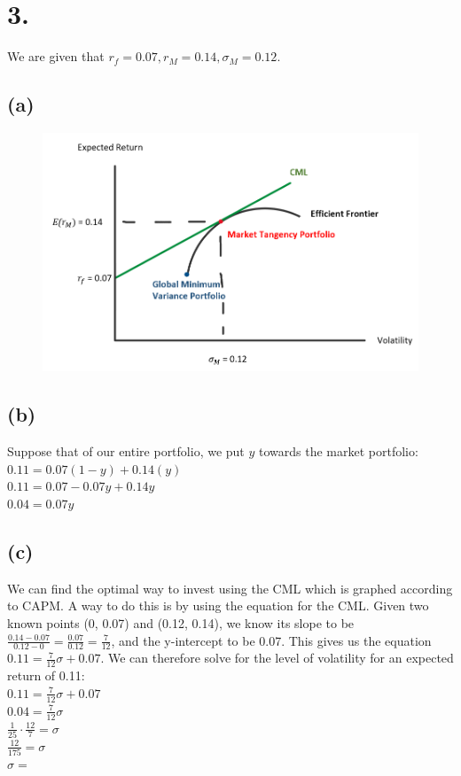 \documentclass{article}
\begin{document}
\section*{3.}
{\Large 

We are given that $r_f = 0.07, r_M = 0.14, \sigma_M = 0.12$.

\subsection*{(a)}

\begin{figure}[h]
  \centering
  \includegraphics[width=120mm]{./3a.png}
\end{figure}

\subsection*{(b)}

Suppose that of our entire portfolio, we put $y$ towards the market portfolio: \\
$0.11 = 0.07(1-y) + 0.14(y)$ \\ 
$0.11 = 0.07 - 0.07y + 0.14y$ \\ 
$0.04 = 0.07y$ \\ 


\subsection*{(c)}

We can find the optimal way to invest using the CML which is graphed according to CAPM. A way to do this is by using the equation for the CML. Given two known points (0, 0.07) and (0.12, 0.14), we know its slope to be $\frac{0.14-0.07}{0.12 - 0} = \frac{0.07}{0.12} = \frac{7}{12}$, and the y-intercept to be 0.07. This gives us the equation $0.11 = \frac{7}{12}\sigma + 0.07$. We can therefore solve for the level of volatility for an expected return of 0.11: \\
$0.11 = \frac{7}{12}\sigma + 0.07$ \\
$0.04 = \frac{7}{12}\sigma$ \\
$\frac{1}{25} \cdot \frac{12}{7} = \sigma$ \\
$\frac{12}{175} = \sigma$ \\
$\sigma = $ 

}
\end{document}
